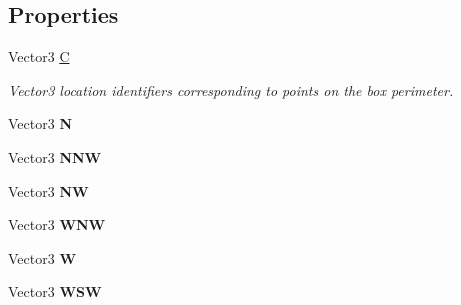 \subsection*{Properties}
\begin{DoxyCompactItemize}
\item 
Vector3 \mbox{\hyperlink{class_room_kit_1_1_topo_box_a49b90eeff3ec40cba9f66ddfca10b75f}{C}}
\begin{DoxyCompactList}\small\item\em Vector3 location identifiers corresponding to points on the box perimeter. \end{DoxyCompactList}\item 
\mbox{\label{class_room_kit_1_1_topo_box_a4c5e7153de4c0993e5aaa880d153f77b}} 
Vector3 {\bfseries N}
\item 
\mbox{\label{class_room_kit_1_1_topo_box_a2bbe15740eca32ac11b66ae9fdf71d56}} 
Vector3 {\bfseries N\+NW}
\item 
\mbox{\label{class_room_kit_1_1_topo_box_ae0cfe37d3dad050ab24db7be23a6f7f3}} 
Vector3 {\bfseries NW}
\item 
\mbox{\label{class_room_kit_1_1_topo_box_a9bca590a5cc4f6f33bbb8a56c0fe39bd}} 
Vector3 {\bfseries W\+NW}
\item 
\mbox{\label{class_room_kit_1_1_topo_box_ac67dffe4e3c7a1644bbe6b0624a16af5}} 
Vector3 {\bfseries W}
\item 
\mbox{\label{class_room_kit_1_1_topo_box_a49c18755a536e48d4e5b46c7165d38db}} 
Vector3 {\bfseries W\+SW}
\item 

\end{DoxyCompactItemize}
